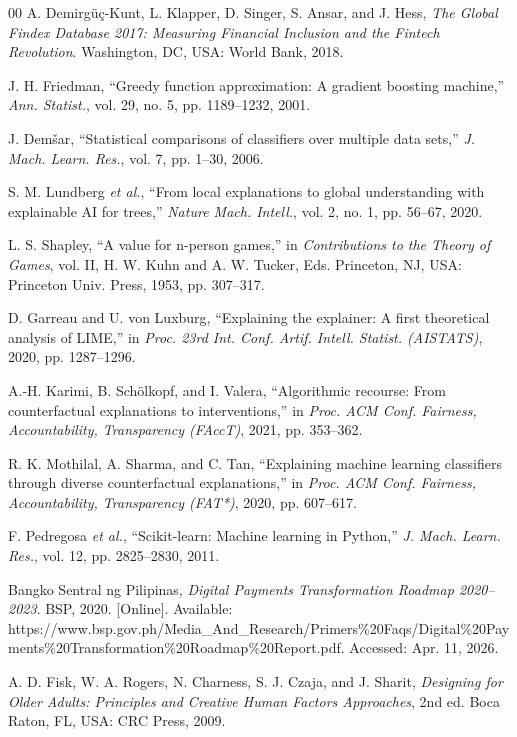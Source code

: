 \documentclass[journal]{./IEEE/IEEEtran}
\begin{document}
\begin{thebibliography}{00}
 A. Demirg\"u\c{c}-Kunt, L. Klapper, D. Singer, S. Ansar, and J. Hess, \emph{The Global Findex Database 2017: Measuring Financial Inclusion and the Fintech Revolution}. Washington, DC, USA: World Bank, 2018.

 J. H. Friedman, ``Greedy function approximation: A gradient boosting machine,'' \emph{Ann. Statist.}, vol. 29, no. 5, pp. 1189--1232, 2001.

 J. Dem\v{s}ar, ``Statistical comparisons of classifiers over multiple data sets,'' \emph{J. Mach. Learn. Res.}, vol. 7, pp. 1--30, 2006.

 S. M. Lundberg \emph{et al.}, ``From local explanations to global understanding with explainable AI for trees,'' \emph{Nature Mach. Intell.}, vol. 2, no. 1, pp. 56--67, 2020.

 L. S. Shapley, ``A value for n-person games,'' in \emph{Contributions to the Theory of Games}, vol. II, H. W. Kuhn and A. W. Tucker, Eds. Princeton, NJ, USA: Princeton Univ. Press, 1953, pp. 307--317.

 D. Garreau and U. von Luxburg, ``Explaining the explainer: A first theoretical analysis of LIME,'' in \emph{Proc. 23rd Int. Conf. Artif. Intell. Statist. (AISTATS)}, 2020, pp. 1287--1296.

 A.-H. Karimi, B. Sch\"olkopf, and I. Valera, ``Algorithmic recourse: From counterfactual explanations to interventions,'' in \emph{Proc. ACM Conf. Fairness, Accountability, Transparency (FAccT)}, 2021, pp. 353--362.

 R. K. Mothilal, A. Sharma, and C. Tan, ``Explaining machine learning classifiers through diverse counterfactual explanations,'' in \emph{Proc. ACM Conf. Fairness, Accountability, Transparency (FAT*)}, 2020, pp. 607--617.

 F. Pedregosa \emph{et al.}, ``Scikit-learn: Machine learning in Python,'' \emph{J. Mach. Learn. Res.}, vol. 12, pp. 2825--2830, 2011.

 Bangko Sentral ng Pilipinas, \emph{Digital Payments Transformation Roadmap 2020--2023}. BSP, 2020. [Online]. Available: https://www.bsp.gov.ph/Media\_And\_Research/Primers\%20Faqs/Digital\%20Payments\%20Transformation\%20Roadmap\%20Report.pdf. Accessed: Apr. 11, 2026.

 A. D. Fisk, W. A. Rogers, N. Charness, S. J. Czaja, and J. Sharit, \emph{Designing for Older Adults: Principles and Creative Human Factors Approaches}, 2nd ed. Boca Raton, FL, USA: CRC Press, 2009.


\end{thebibliography}
\end{document}
